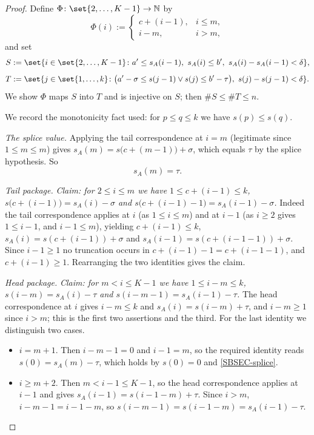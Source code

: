 \begin{proof}
  Define $\Phi \colon \set{2,\dots,K-1} \to \mathbb{N}$ by
  \[
    \Phi(i) := \begin{cases} c+(i-1), & i \le m,\\ i-m, & i > m,\end{cases}
  \]
  and set
  \[
    S := \set{ i \in \set{2,\dots,K-1} \colon a' \le s_A(i-1),\ s_A(i) \le b',\
      s_A(i)-s_A(i-1) < \delta },
  \]
  \[
    T := \set{ j \in \set{1,\dots,k} \colon \bigl(a'-\sigma\le s(j-1) \vee s(j)\le b'-\tau\bigr),\
      s(j)-s(j-1)<\delta }
    .
  \]
  We show $\Phi$ maps $S$ into $T$ and is injective on $S$; then $\#S \le \#T \le n$.

  We record the monotonicity fact used: for $p \le q \le k$ we have $s(p) \le s(q)$.

  \emph{The splice value.} Applying the tail correspondence at $i=m$ (legitimate since
  $1 \le m \le m$) gives $s_A(m) = s\bigl(c+(m-1)\bigr)+\sigma$, which equals $\tau$ by the splice
  hypothesis. So
  \begin{equation}\label{SBSEC-splice}
    s_A(m) = \tau .
  \end{equation}

  \emph{Tail package.} \emph{Claim: for $2 \le i \le m$ we have $1 \le c+(i-1) \le k$,
  $s\bigl(c+(i-1)\bigr) = s_A(i)-\sigma$ and $s\bigl(c+(i-1)-1\bigr) = s_A(i-1)-\sigma$.}
  Indeed the tail correspondence applies at $i$ (as $1\le i\le m$) and at $i-1$ (as $i \ge 2$
  gives $1 \le i-1$, and $i-1 \le m$), yielding $c+(i-1)\le k$,
  $s_A(i) = s(c+(i-1))+\sigma$ and $s_A(i-1) = s(c+(i-1-1))+\sigma$. Since $i-1 \ge 1$ no
  truncation occurs in $c+(i-1)-1 = c+(i-1-1)$, and $c+(i-1)\ge 1$. Rearranging the two identities
  gives the claim.

  \emph{Head package.} \emph{Claim: for $m < i \le K-1$ we have $1 \le i-m \le k$,
  $s(i-m) = s_A(i)-\tau$ and $s(i-m-1) = s_A(i-1)-\tau$.} The head correspondence at $i$ gives
  $i-m\le k$ and $s_A(i) = s(i-m)+\tau$, and $i-m\ge1$ since $i>m$; this is the first two
  assertions and the third. For the last identity we distinguish two cases.
  \begin{itemize}
    \item $i = m+1$. Then $i-m-1 = 0$ and $i-1 = m$, so the required identity reads
      $s(0) = s_A(m)-\tau$, which holds by $s(0)=0$ and \eqref{SBSEC-splice}.
    \item $i \ge m+2$. Then $m < i-1 \le K-1$, so the head correspondence applies at $i-1$ and
      gives $s_A(i-1) = s(i-1-m)+\tau$. Since $i > m$, $i-m-1 = i-1-m$, so
      $s(i-m-1) = s(i-1-m) = s_A(i-1)-\tau$.
  \end{itemize}


\end{proof}
